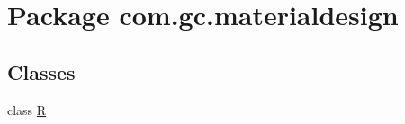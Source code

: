 \hypertarget{namespacecom_1_1gc_1_1materialdesign}{}\section{Package com.\+gc.\+materialdesign}
\label{namespacecom_1_1gc_1_1materialdesign}
\subsection*{Classes}
\begin{DoxyCompactItemize}
\item 
class \hyperlink{classcom_1_1gc_1_1materialdesign_1_1_r}{R}
\end{DoxyCompactItemize}

